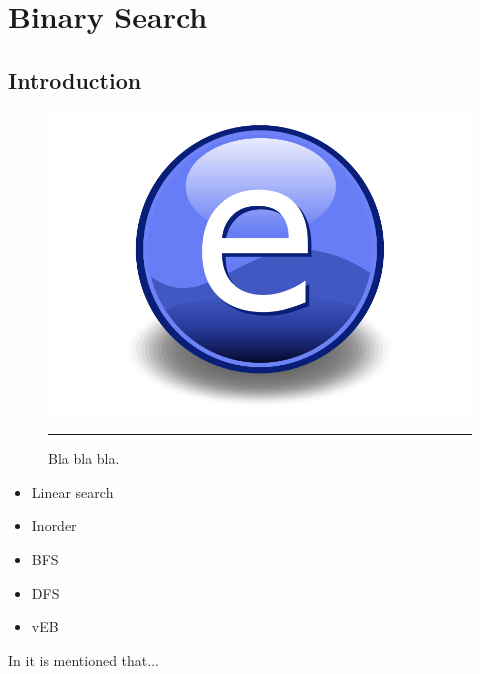 
\chapter{Binary Search} %

\label{Chapter1} %



\section{Introduction}


\begin{figure}[htbp]
	\centering
		\includegraphics[width=\textwidth]{./Figures/example.pdf}
		\rule{35em}{0.5pt}
	\caption[example]{
	Bla bla bla.
	}
	\label{fig:example}
\end{figure}


\begin{itemize} 
\item Linear search
\item Inorder
\item BFS
\item DFS
\item vEB
\end{itemize}


In \citep{someArticle} it is mentioned that...